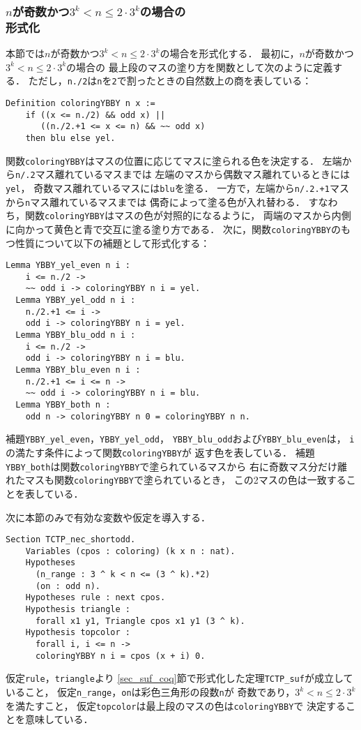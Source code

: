\subsubsection{$n$が奇数かつ$3^{k} < n \leq 2 \cdot 3^{k}$の場合の\\形式化}
本節では$n$が奇数かつ$3^{k} < n \leq 2 \cdot 3^{k}$の場合を形式化する．
最初に，$n$が奇数かつ$3^{k} < n \leq 2 \cdot 3^{k}$の場合の
最上段のマスの塗り方を関数として次のように定義する．
ただし，{\tt{n./2}}は{\tt{n}}を{\tt{2}}で割ったときの自然数上の商を表している：
\begin{lstlisting}[language=Coq]
  Definition coloringYBBY n x :=
    if ((x <= n./2) && odd x) ||
       ((n./2.+1 <= x <= n) && ~~ odd x)
    then blu else yel.
\end{lstlisting}
関数{\tt{coloringYBBY}}はマスの位置に応じてマスに塗られる色を決定する．
左端から{\tt{n/.2}}マス離れているマスまでは
左端のマスから偶数マス離れているときには{\tt{yel}}，
奇数マス離れているマスには{\tt{blu}}を塗る．
一方で，左端から{\tt{n/.2.+1}}マスから{\tt{n}}マス離れているマスまでは
偶奇によって塗る色が入れ替わる．
すなわち，関数{\tt{coloringYBBY}}はマスの色が対照的になるように，
両端のマスから内側に向かって黄色と青で交互に塗る塗り方である．
次に，関数{\tt{coloringYBBY}}のもつ性質について以下の補題として形式化する：
\begin{lstlisting}[language=Coq]
  Lemma YBBY_yel_even n i :
    i <= n./2 ->
    ~~ odd i -> coloringYBBY n i = yel.
  Lemma YBBY_yel_odd n i :
    n./2.+1 <= i ->
    odd i -> coloringYBBY n i = yel.
  Lemma YBBY_blu_odd n i :
    i <= n./2 ->
    odd i -> coloringYBBY n i = blu.
  Lemma YBBY_blu_even n i :
    n./2.+1 <= i <= n ->
    ~~ odd i -> coloringYBBY n i = blu.
  Lemma YBBY_both n :
    odd n -> coloringYBBY n 0 = coloringYBBY n n.
\end{lstlisting}
補題{\tt{YBBY\_yel\_even}}，{\tt{YBBY\_yel\_odd}}，
{\tt{YBBY\_blu\_odd}}および{\tt{YBBY\_blu\_even}}は，
{\tt{i}}の満たす条件によって関数{\tt{coloringYBBY}}が
返す色を表している．
補題{\tt{YBBY\_both}}は関数{\tt{coloringYBBY}}で塗られているマスから
右に奇数マス分だけ離れたマスも関数{\tt{coloringYBBY}}で塗られているとき，
この2マスの色は一致することを表している．

次に本節のみで有効な変数や仮定を導入する．
\begin{lstlisting}[language=Coq]
  Section TCTP_nec_shortodd.
    Variables (cpos : coloring) (k x n : nat).
    Hypotheses
      (n_range : 3 ^ k < n <= (3 ^ k).*2)
      (on : odd n).
    Hypotheses rule : next cpos.
    Hypothesis triangle :
      forall x1 y1, Triangle cpos x1 y1 (3 ^ k).
    Hypothesis topcolor :
      forall i, i <= n ->
      coloringYBBY n i = cpos (x + i) 0.
\end{lstlisting}
仮定{\tt{rule}}，{\tt{triangle}}より
\ref{sec_suf_coq}節で形式化した定理{\tt{TCTP\_suf}}が成立していること，
仮定{\tt{n\_range}}，{\tt{on}}は彩色三角形の段数{\tt{n}}が
奇数であり，$3^{k} < n \leq 2 \cdot 3^{k}$を満たすこと，
仮定{\tt{topcolor}}は最上段のマスの色は{\tt{coloringYBBY}}で
決定することを意味している．

